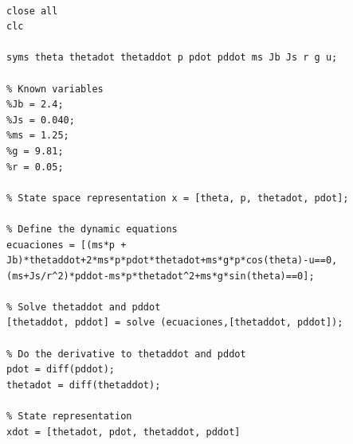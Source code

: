 \documentclass{article}
\begin{document}
\noindent
    \begin{tcolorbox}[
        title={File \texttt{answer\_2.m}},
        width=13cm,
    ]
    
\begin{scriptsize}
\begin{verbatim}

close all
clc

syms theta thetadot thetaddot p pdot pddot ms Jb Js r g u;

% Known variables
%Jb = 2.4;
%Js = 0.040;
%ms = 1.25;
%g = 9.81;
%r = 0.05;

% State space representation x = [theta, p, thetadot, pdot];

% Define the dynamic equations
ecuaciones = [(ms*p + Jb)*thetaddot+2*ms*p*pdot*thetadot+ms*g*p*cos(theta)-u==0,
(ms+Js/r^2)*pddot-ms*p*thetadot^2+ms*g*sin(theta)==0];

% Solve thetaddot and pddot
[thetaddot, pddot] = solve (ecuaciones,[thetaddot, pddot]);

% Do the derivative to thetaddot and pddot
pdot = diff(pddot);
thetadot = diff(thetaddot);

% State representation
xdot = [thetadot, pdot, thetaddot, pddot]

\end{verbatim}
\end{scriptsize}
\end{tcolorbox}
\end{document}
